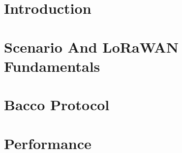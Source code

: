 \restoregeometry


\thispagestyle{empty} %
\cleardoublepage

\thispagestyle{empty}

\clearpage{\pagestyle{plain}\cleardoublepage}


\printunsrtglossary[type=main]

\clearpage{\pagestyle{plain}\cleardoublepage}
\tableofcontents

\clearpage{\pagestyle{plain}\cleardoublepage}

\chapter*{Introduction}
\label{chapter:introduction}
 


\chapter{Scenario And LoRaWAN Fundamentals}
\label{chapter:cap1}


%

%

\chapter{Bacco Protocol}
\label{chapter:protocol}



\chapter{Performance}
\label{chapter:performance}


%

